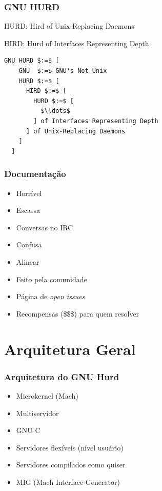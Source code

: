 \documentclass[10pt]{beamer}
\theoremstyle{plain}
\begin{document}
\begin{frame}[fragile]
  \frametitle{GNU HURD}

  HURD\@: Hird of Unix-Replacing Daemons

  HIRD\@: Hurd of Interfaces Representing Depth

  \begin{lstlisting}[mathescape=true,showstringspaces=false,numbers=none,frame=single]
  GNU HURD $:=$ [
    GNU  $:=$ GNU's Not Unix
    HURD $:=$ [
      HIRD $:=$ [
        HURD $:=$ [
          $\ldots$
        ] of Interfaces Representing Depth
      ] of Unix-Replacing Daemons
    ]
  ]
  \end{lstlisting}

\end{frame}

\begin{frame}
  \frametitle{Documentação}

  \begin{itemize}
    \item Horrível
    \item Escassa
    \item Conversas no IRC
    \item Confusa
    \item Alinear
    \item Feito pela comunidade
    \item Página de \textit{open issues}
    \item Recompensas (\$\$\$) para quem resolver
  \end{itemize}
\end{frame}

\section{Arquitetura Geral}

\begin{frame}
  \frametitle{Arquitetura do GNU Hurd}

  \begin{itemize}
    \item Microkernel (Mach)
    \item Multiservidor
    \item GNU C
    \item Servidores flexíveis (nível usuário)
    \item Servidores compilados como quiser
    \item MIG (Mach Interface Generator)
  \end{itemize}
\end{frame}
\end{document}
